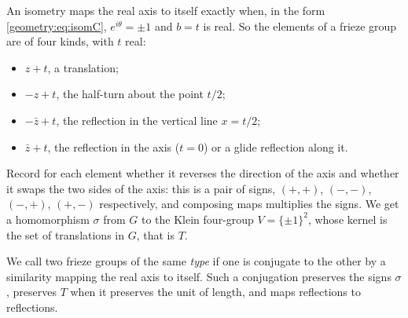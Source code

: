 An isometry maps the real axis to itself exactly when, in the form \eqref{geometry:eq:isomC}, $e^{i\theta}=\pm1$ and $b=t$ is real. So the elements
of a frieze group are of four kinds, with $t$ real:
\begin{itemize}
\item $z+t$, a translation;
\item $-z+t$, the half-turn about the point $t/2$;
\item $-\bar z+t$, the reflection in the vertical line $x=t/2$;
\item $\bar z+t$, the reflection in the axis ($t=0$) or a glide reflection along it.
\end{itemize}
Record for each element whether it reverses the direction of the axis and whether it swaps the two sides of the axis: this is a pair of
signs, $(+,+)$, $(-,-)$, $(-,+)$, $(+,-)$ respectively, and composing maps multiplies the signs. We get a homomorphism $\sigma$ from $G$ to the
Klein four-group $V=\{\pm1\}^2$, whose kernel is the set of translations in $G$, that is $T$.

We call two frieze groups of the same \emph{type} if one is conjugate to the other by a similarity mapping the real axis to itself. Such a
conjugation preserves the signs $\sigma$, preserves $T$ when it preserves the unit of length, and maps reflections to reflections.

